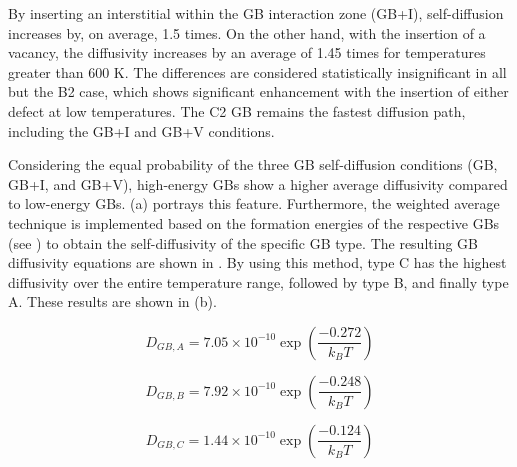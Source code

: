 \documentclass[review]{elsarticle}
\begin{document}
By inserting an interstitial within the GB interaction zone (GB+I), self-diffusion increases by, on average, 1.5 times. On the other hand, with the insertion of a vacancy, the diffusivity increases by an average of 1.45 times for temperatures greater than 600 K. The differences are considered statistically insignificant in all but the B2 case, which shows significant enhancement with the insertion of either defect at low temperatures. The C2 GB remains the fastest diffusion path, including the GB+I and GB+V conditions. 

Considering the equal probability of the three GB self-diffusion conditions (GB, GB+I, and GB+V), high-energy GBs show a higher average diffusivity compared to low-energy GBs.  (a) portrays this feature. Furthermore, the weighted average technique is implemented based on the formation energies of the respective GBs (see ) to obtain the self-diffusivity of the specific GB type. The resulting GB diffusivity equations are shown in . By using this method, type C has the highest diffusivity over the entire temperature range, followed by type B, and finally type A. These results are shown in  (b).

\begin{equation}
\label{eq:type}
D_{GB,A} = 7.05 \times 10^{-10} \exp\left(\frac{-0.272}{k_{B} T}\right)
\end{equation}

\begin{equation}
\label{eq:type1}
D_{GB,B} = 7.92 \times 10^{-10} \exp\left(\frac{-0.248}{k_{B} T}\right)
\end{equation}

\begin{equation}
\label{eq:type2}
D_{GB,C} = 1.44 \times 10^{-10} \exp\left(\frac{-0.124}{k_{B} T}\right)
\end{equation}
\end{document}
